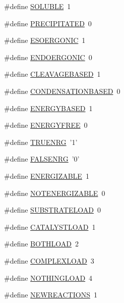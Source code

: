 \begin{DoxyCompactItemize}
\item 
\#define \hyperlink{a00024_a248fc87e714b5d729453d11fbeec8310}{S\-O\-L\-U\-B\-L\-E}~1
\item 
\#define \hyperlink{a00024_af270dce996bbfb82cc5d337af5b980e5}{P\-R\-E\-C\-I\-P\-I\-T\-A\-T\-E\-D}~0
\item 
\#define \hyperlink{a00024_ac23ad60cb24df0616d58202351b11e60}{E\-S\-O\-E\-R\-G\-O\-N\-I\-C}~1
\item 
\#define \hyperlink{a00024_a83346194720cacc0144e87246d23081b}{E\-N\-D\-O\-E\-R\-G\-O\-N\-I\-C}~0
\item 
\#define \hyperlink{a00024_a9c2a0137e4b97849150ab0842da3064c}{C\-L\-E\-A\-V\-A\-G\-E\-B\-A\-S\-E\-D}~1
\item 
\#define \hyperlink{a00024_ad722fbaf2330838fb9522c028141de6c}{C\-O\-N\-D\-E\-N\-S\-A\-T\-I\-O\-N\-B\-A\-S\-E\-D}~0
\item 
\#define \hyperlink{a00024_aca2c6e3c97c1e9728693b5c3c8c7f229}{E\-N\-E\-R\-G\-Y\-B\-A\-S\-E\-D}~1
\item 
\#define \hyperlink{a00024_a3efd65798c1856deacf187790b3f9ef5}{E\-N\-E\-R\-G\-Y\-F\-R\-E\-E}~0
\item 
\#define \hyperlink{a00024_a903e07285c96e6fbb9aa3577ddd1f327}{T\-R\-U\-E\-N\-R\-G}~'1'
\item 
\#define \hyperlink{a00024_ada187b73f4b4a504680ead4f86785021}{F\-A\-L\-S\-E\-N\-R\-G}~'0'
\item 
\#define \hyperlink{a00024_a2ce381beee4efd263052e93f9cbbfc77}{E\-N\-E\-R\-G\-I\-Z\-A\-B\-L\-E}~1
\item 
\#define \hyperlink{a00024_a04e076b71093a6dc76f99298d9cfeb9e}{N\-O\-T\-E\-N\-E\-R\-G\-I\-Z\-A\-B\-L\-E}~0
\item 
\#define \hyperlink{a00024_a5a83a3ca25e31afb2d58aa40c8b1fbbb}{S\-U\-B\-S\-T\-R\-A\-T\-E\-L\-O\-A\-D}~0
\item 
\#define \hyperlink{a00024_a7e521c899f69e37df3501fd0e652c517}{C\-A\-T\-A\-L\-Y\-S\-T\-L\-O\-A\-D}~1
\item 
\#define \hyperlink{a00024_afb6d1105a81463fbadceff0217332f68}{B\-O\-T\-H\-L\-O\-A\-D}~2
\item 
\#define \hyperlink{a00024_a7eb138e043eb9ec6d717c6178724bbaf}{C\-O\-M\-P\-L\-E\-X\-L\-O\-A\-D}~3
\item 
\#define \hyperlink{a00024_a15e77522039bb4bb52000b65773c83cf}{N\-O\-T\-H\-I\-N\-G\-L\-O\-A\-D}~4
\item 
\#define \hyperlink{a00024_afb2a947dfb1847f71649f82bc1bf0292}{N\-E\-W\-R\-E\-A\-C\-T\-I\-O\-N\-S}~1
\item 

\end{DoxyCompactItemize}
